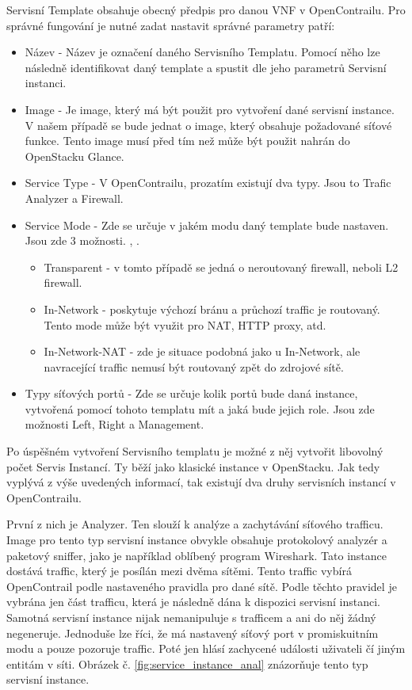 Servisní Template obsahuje obecný předpis pro danou VNF v OpenContrailu. Pro správné fungování je nutné zadat nastavit správné parametry patří:

\begin{itemize}
\item Název - Název je označení daného Servisního Templatu. Pomocí něho lze následně identifikovat daný template a spustit dle jeho parametrů Servisní instanci. 
\item Image - Je image, který má být použit pro vytvoření dané servisní instance. V našem případě se bude jednat o image, který obsahuje požadované síťové funkce. Tento image musí před tím než může být použit  nahrán do OpenStacku Glance.
\item Service Type - V OpenContrailu, prozatím existují dva typy. Jsou to Trafic Analyzer a Firewall.
\item Service Mode - Zde se určuje v jakém modu daný template bude nastaven. Jsou zde 3 možnosti. , .

	\begin{itemize}
	\item Transparent - v tomto případě se jedná o neroutovaný firewall, neboli L2 firewall.
	\item In-Network - poskytuje výchozí bránu a průchozí traffic je routovaný. Tento mode může být využit pro NAT, HTTP proxy, atd.
	\item In-Network-NAT - zde je situace podobná jako u In-Network, ale navracející traffic nemusí být routovaný zpět do zdrojové sítě.
	\end{itemize}

\item Typy síťových portů - Zde se určuje kolik portů bude daná instance, vytvořená pomocí tohoto templatu mít a jaká bude jejich role. Jsou zde možnosti Left, Right a Management. 
\end{itemize}

Po úspěšném vytvoření Servisního templatu je možné z něj vytvořit libovolný počet Servis Instancí.  Ty běží jako klasické instance v OpenStacku. Jak tedy vyplývá z výše uvedených informací, tak existují dva druhy servisních instancí v OpenContrailu. 

První z nich je Analyzer. Ten slouží k analýze a zachytávání síťového trafficu. Image pro tento typ servisní instance obvykle obsahuje protokolový analyzér a paketový sniffer, jako je například oblíbený program Wireshark. Tato instance dostává traffic, který je posílán mezi dvěma sítěmi. Tento traffic vybírá OpenContrail podle nastaveného pravidla pro dané sítě. Podle těchto pravidel je vybrána jen část trafficu, která je následně dána k dispozici servisní instanci. Samotná servisní instance nijak nemanipuluje s trafficem a ani do něj žádný negeneruje. Jednoduše lze říci, že má nastavený síťový port v promiskuitním modu a pouze pozoruje traffic. Poté jen hlásí zachycené události uživateli čí jiným entitám v síti. Obrázek č. \ref{fig:service_instance_anal} znázorňuje tento typ servisní instance.

